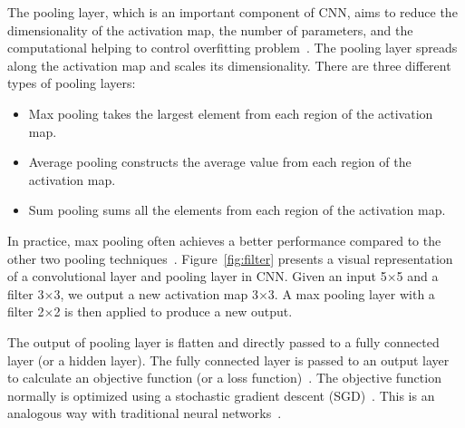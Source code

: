 The pooling layer, which is an important component of CNN, aims to reduce the dimensionality of the activation map, the number of parameters, and the computational helping to control overfitting problem~\cite{tolias2015particular}. The pooling layer spreads along the activation map and scales its dimensionality. There are three different types of pooling layers:
\begin{itemize}
	\item Max pooling takes the largest element from each region of the activation map.
	\item Average pooling constructs the average value from each region of the activation map.
	\item Sum pooling sums all the elements from each region of the activation map. 
\end{itemize}
In practice, max pooling often achieves a better performance compared to the other two pooling techniques~\cite{zeiler2013stochastic}. Figure~\ref{fig:filter} presents a visual representation of a convolutional layer and pooling layer in CNN. Given an input 5$\times$5 and a filter 3$\times$3, we output a new activation map 3$\times$3. A max pooling layer with a filter 2$\times$2 is then applied to produce a new output. 

The output of pooling layer is flatten and directly passed to a fully connected layer (or a hidden layer). The fully connected layer is passed to an output layer to calculate an objective function (or a loss function)~\cite{zhao2017loss}. The objective function normally is optimized using a stochastic gradient descent (SGD)~\cite{bottou2010large}. This is an analogous way with traditional neural networks~\cite{huang1988neural}.



